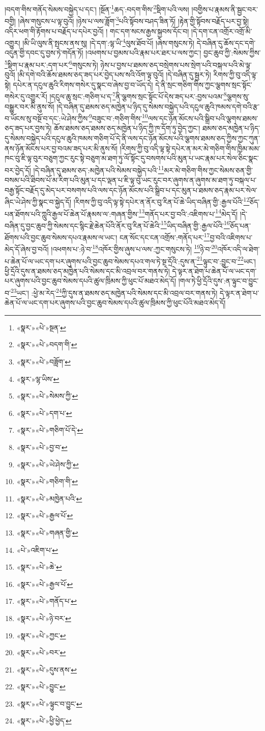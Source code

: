 །བདག་གིས་གནོད་སེམས་བསྐྱེད་པ་དང་། །སྔོན་\footnote{«སྣར་»«པེ་»སྔན་}ཆད་:བདག་གིས་\footnote{«སྣར་»«པེ་»བདག་གི་}སྡིག་པའི་ལས། །བགྱིས་པ་རྣམས་ནི་སྦྱང་བར་བགྱི། །ཞེས་གསུངས་པ་ལྟ་བུའོ། །ཉེས་པ་ལས་ཟློག་\footnote{«སྣར་»«པེ་»བཟློག་}པའི་སྟོབས་བཤད་ཟིན་ཏོ། །རྟེན་གྱི་སྟོབས་བརྗོད་པར་བྱ་སྟེ། འདིར་ཕག་གི་རྟོགས་པ་བརྗོད་པ་དཔེར་བྱའོ། །
གང་དག་སངས་རྒྱས་སྐྱབས་དོང་བ། །དེ་དག་ངན་འགྲོར་འགྲོ་མི་འགྱུར། །མི་ཡི་ལུས་ནི་སྤངས་ནས་སུ། །དེ་དག་:ལྷ་ཡི་\footnote{«སྣར་»ལྷ་ཡིས་}ལུས་ཐོབ་པོ། །ཞེས་གསུངས་ཏེ། དེ་བཞིན་དུ་ཆོས་དང་དགེ་འདུན་གྱི་དབང་དུ་བྱས་ཏེ་གདོན་ཏོ། །འཕགས་པ་བྱམས་པའི་རྣམ་པར་ཐར་པ་ལས་ཀྱང་། བྱང་ཆུབ་ཀྱི་:སེམས་ཀྱིས་\footnote{«སྣར་»«པེ་»སེམས་ཀྱི་}སྡིག་པ་རྣམ་པར་:དག་པར་\footnote{«སྣར་»«པེ་»དག་པ་}གསུངས་ཏེ། ཉེས་པ་བྱས་པ་ཐམས་ཅད་བསྲེགས་པས་སྲེག་པའི་བསྐལ་པའི་མེ་ལྟ་བུའོ། །མི་དགེ་བའི་ཆོས་ཐམས་ཅད་ཟད་པར་བྱེད་པས་སའི་འོག་ལྟ་བུའོ། །དེ་བཞིན་དུ་སྦྱར་ཏེ། རིགས་ཀྱི་བུ་འདི་ལྟ་སྟེ། དཔེར་ན་དངུལ་ཆུའི་རིགས་གསེར་དུ་སྣང་བ་ཞེས་བྱ་བ་ཡོད་དེ། དེ་ནི་སྲང་གཅིག་གིས་ཀྱང་ལྕགས་སྲང་སྟོང་གསེར་དུ་འགྱུར་རོ། །དངུལ་ཆུ་སྲང་:གཅིག་པ་ད་\footnote{«སྣར་»«པེ་»གཅིག་པོ་དེ་}ནི་ལྕགས་སྲང་སྟོང་པོ་དེས་ཟད་པར་:བྱས་པའམ་\footnote{«སྣར་»«པེ་»བྱ་བ་}ལྕགས་སུ་བསྒྱུར་བར་མི་ནུས་སོ། །དེ་བཞིན་དུ་ཐམས་ཅད་མཁྱེན་པ་ཉིད་དུ་སེམས་བསྐྱེད་པའི་དངུལ་ཆུའི་ཁམས་དགེ་བའི་རྩ་བ་ཡོངས་སུ་བསྔོ་བ་དང་:ཡེ་ཤེས་ཀྱིས་\footnote{«སྣར་»«པེ་»ཡེ་ཤེས་ཀྱི་}བཟུང་བ་:གཅིག་གིས་\footnote{«སྣར་»«པེ་»གཅིག་གི་}ལས་དང་ཉོན་མོངས་པའི་སྒྲིབ་པའི་ལྕགས་ཐམས་ཅད་ཟད་པར་བྱས་ཏེ། ཆོས་ཐམས་ཅད་ཐམས་ཅད་མཁྱེན་པ་ཉིད་ཀྱི་ཁ་དོག་ཏུ་བྱེད་ཀྱང་། ཐམས་ཅད་མཁྱེན་པ་ཉིད་དུ་སེམས་བསྐྱེད་པའི་དངུལ་ཆུའི་ཁམས་གཅིག་པོ་དེ་ནི་ལས་དང་ཉོན་མོངས་པའི་ལྕགས་ཐམས་ཅད་ཀྱིས་ཀྱང་ཀུན་ནས་ཉོན་མོངས་པར་བྱ་བའམ་ཟད་པར་མི་ནུས་སོ། །རིགས་ཀྱི་བུ་འདི་ལྟ་སྟེ་དཔེར་ན་མར་མེ་གཅིག་གིས་ཁྱིམ་མམ་ཁང་བུ་ཇི་ལྟ་བུར་བཅུག་ཀྱང་རུང་སྟེ་བཅུག་མ་ཐག་ཏུ་ལོ་སྟོང་དུ་བསགས་པའི་མུན་པ་ཡང་རྣམ་པར་སེལ་ཅིང་སྣང་བར་བྱེད་དོ། །དེ་བཞིན་དུ་ཐམས་ཅད་:མཁྱེན་པའི་སེམས་བསྐྱེད་པའི་\footnote{«སྣར་»«པེ་»མཁྱེན་པའི་}མར་མེ་གཅིག་གིས་ཀྱང་སེམས་ཅན་གྱི་བསམ་པའི་ཐིབས་པོ་མ་རིག་པའི་མུན་པ་དང་ལྡན་པ་ཇི་ལྟ་བུ་ཡང་རུང་བར་ཞུགས་ན་ཞུགས་མ་ཐག་ཏུ་བསྐལ་པ་བརྒྱ་སྟོང་བརྗོད་དུ་མེད་པར་བསགས་པའི་ལས་དང་ཉོན་མོངས་པའི་སྒྲིབ་པ་དང་མུན་པ་ཐམས་ཅད་རྣམ་པར་སེལ་ཞིང་ཡེ་ཤེས་ཀྱི་སྣང་བ་སྐྱེད་དོ། །རིགས་ཀྱི་བུ་འདི་ལྟ་སྟེ་དཔེར་ན་ནོར་བུ་རིན་པོ་ཆེ་ཡིད་བཞིན་གྱི་:རྒྱལ་པོའི་\footnote{«སྣར་»«པེ་»རྒྱལ་པོ་}ཅོད་པན་ཐོགས་པའི་ཀླུའི་རྒྱལ་པོ་ཆེན་པོ་རྣམས་ལ་:གཞན་གྱིས་\footnote{«སྣར་»«པེ་»གཞན་གྱི་}གནོད་པར་བྱ་བའི་:འཇིགས་པ་\footnote{«པེ་»འཇིག་པ་}མེད་དོ། །དེ་བཞིན་དུ་བྱང་ཆུབ་ཀྱི་སེམས་དང་སྙིང་རྗེ་ཆེན་པོའི་ནོར་བུ་རིན་པོ་ཆེའི་\footnote{«སྣར་»«པེ་»ཆེ་}ཡིད་བཞིན་གྱི་:རྒྱལ་པོའི་\footnote{«སྣར་»«པེ་»རྒྱལ་པོ་}ཅོད་པན་ཐོགས་པའི་བྱང་ཆུབ་སེམས་དཔའ་རྣམས་ལ་ཡང་། ངན་སོང་དང་ངན་འགྲོས་:གནོད་པར་\footnote{«སྣར་»«པེ་»གནོད་པ་}བྱ་བའི་འཇིགས་པ་མེད་དོ་ཞེས་བྱ་བའོ། །འཕགས་པ་:ཉེ་བ་\footnote{«སྣར་»«པེ་»ཉེ་བར་}འཁོར་གྱིས་ཞུས་པ་ལས་:ཀྱང་གསུངས་ཏེ། \footnote{«སྣར་»«པེ་»ཀྱང་}ཉེ་བ་\footnote{«སྣར་»«པེ་»བར་}འཁོར་འདི་ལ་ཐེག་པ་ཆེན་པོ་ལ་ཡང་དག་པར་ཞུགས་པའི་བྱང་ཆུབ་སེམས་དཔའ་གལ་ཏེ་སྔ་དྲོའི་:དུས་ན་\footnote{«སྣར་»«པེ་»དུས་ནས་}ལྟུང་བ་:བྱུང་བ་\footnote{«སྣར་»«པེ་»བྱུང་}ཡང་། ཕྱི་དྲོའི་དུས་ན་ཐམས་ཅད་མཁྱེན་པའི་སེམས་དང་མི་འབྲལ་བར་གནས་ཏེ། དེ་ལྟར་ན་ཐེག་པ་ཆེན་པོ་ལ་ཡང་དག་པར་ཞུགས་པའི་བྱང་ཆུབ་སེམས་དཔའི་ཚུལ་ཁྲིམས་ཀྱི་ཕུང་པོ་མཐའ་མེད་དོ། །གལ་ཏེ་ཕྱི་དྲོའི་དུས་:ན་ལྟུང་བ་བྱུང་བ་\footnote{«སྣར་»«པེ་»ལྟུང་བ་བྱུང་}ཡང་། :ཕྱེ་མ་རེད་\footnote{«སྣར་»«པེ་»ཕྱི་ཕྱེད་}ཀྱི་དུས་ན་ཐམས་ཅད་མཁྱེན་པའི་སེམས་དང་མི་འབྲལ་བར་གནས་ཏེ། དེ་ལྟར་ན་ཐེག་པ་ཆེན་པོ་ལ་ཡང་དག་པར་ཞུགས་པའི་བྱང་ཆུབ་སེམས་དཔའི་ཚུལ་ཁྲིམས་ཀྱི་ཕུང་པོའི་མཐའ་མེད་དོ། 